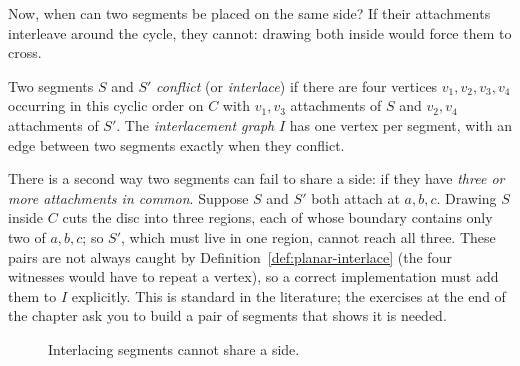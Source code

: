 Now, when can two segments be placed on the same side? If their attachments
interleave around the cycle, they cannot: drawing both inside would force them
to cross.

\begin{definition}\label{def:planar-interlace}
Two segments $S$ and $S'$ \emph{conflict} (or \emph{interlace}) if there are
four vertices $v_1,v_2,v_3,v_4$ occurring in this cyclic order on $C$ with
$v_1,v_3$ attachments of $S$ and $v_2,v_4$ attachments of $S'$.
The \emph{interlacement graph} $I$ has one vertex per segment, with an edge
between two segments exactly when they conflict.
\end{definition}

\begin{remark}%
\label{rem:planar-threeattach}
There is a second way two segments can fail to share a side: if they have
\emph{three or more attachments in common}. Suppose $S$ and $S'$ both attach at
$a,b,c$. Drawing $S$ inside $C$ cuts the disc into three regions, each of whose
boundary contains only two of $a,b,c$; so $S'$, which must live in one region,
cannot reach all three. These pairs are not always caught by
Definition~\ref{def:planar-interlace} (the four witnesses would have to repeat a
vertex), so a correct implementation must add them to $I$ explicitly. This is
standard in the literature; the exercises at the end of the chapter ask you to
build a pair of segments that shows it is needed.
\end{remark}

\begin{figure}[ht]
\centering
{}
\caption{Interlacing segments cannot share a side.}
\label{fig:planar-interlace}
\end{figure}

